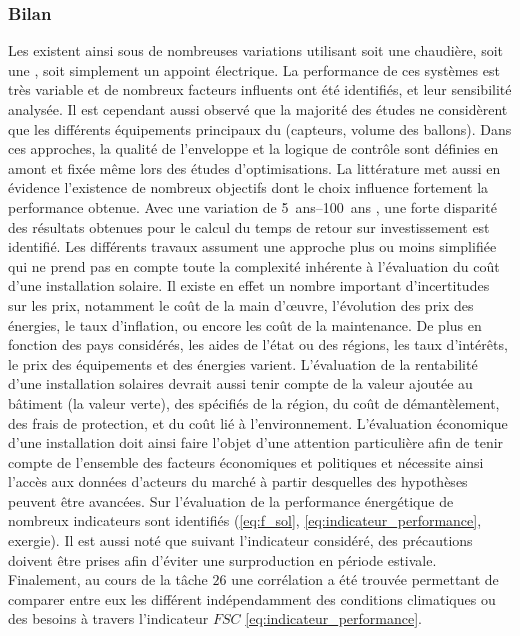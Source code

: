 \subsubsection{Bilan} %
\label{ssub:bilan_travaux}
Les  existent ainsi sous de nombreuses variations utilisant soit une chaudière,
soit une , soit simplement un appoint électrique. La performance de ces systèmes
est très variable et de nombreux facteurs influents ont été identifiés, et leur
sensibilité analysée. Il est cependant aussi observé que la majorité des études ne
considèrent que les différents équipements principaux du  (capteurs, volume des
ballons). Dans ces approches, la qualité de l’enveloppe et la logique de contrôle sont
définies en amont et fixée même lors des études d’optimisations. La littérature met aussi
en évidence l’existence de nombreux objectifs dont le choix influence fortement la
performance obtenue. Avec une variation de \SIrange{5}{100}{ans}
\parencite{Tsalikis2015743,Hin2014102}, une forte disparité des résultats obtenues pour le
calcul du temps de retour sur investissement est identifié. Les différents travaux
assument une approche plus ou moins simplifiée qui ne prend pas en compte toute
la complexité inhérente à l’évaluation du coût d’une installation solaire. Il existe en
effet un nombre important d’incertitudes sur les prix, notamment le coût de la main
d’œuvre, l’évolution des prix des énergies, le taux d’inflation, ou encore les coût de la
maintenance. De plus en fonction des pays considérés, les aides de l’état ou des régions,
les taux d’intérêts, le prix des équipements et des énergies varient. L’évaluation de la
rentabilité d’une installation solaires devrait aussi tenir compte de la valeur ajoutée au
bâtiment (la valeur verte), des spécifiés de la région, du coût de démantèlement, des
frais de protection, et du coût lié à l’environnement. L’évaluation économique d’une
installation doit ainsi faire l’objet d’une attention particulière afin de tenir compte de
l’ensemble des facteurs économiques et politiques et nécessite ainsi l’accès aux données
d’acteurs du marché à partir desquelles des hypothèses peuvent être avancées. Sur
l’évaluation de la performance énergétique de nombreux indicateurs sont identifiés
(\eqref{eq:f_sol}, \eqref{eq:indicateur_performance}, exergie). Il est aussi noté que
suivant l’indicateur considéré, des précautions doivent être prises afin d’éviter une
surproduction en période estivale. Finalement, au cours de la tâche $26$ une corrélation a
été trouvée permettant de comparer entre eux les différent  indépendamment des
conditions climatiques ou des besoins à travers l’indicateur $FSC$
\eqref{eq:indicateur_performance}.





